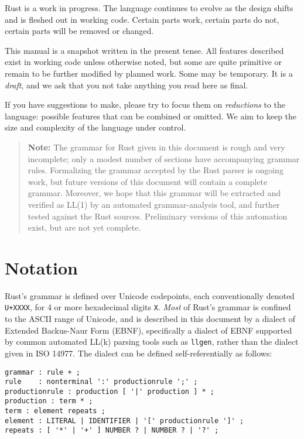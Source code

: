 \documentclass[]{article}
\begin{document}
Rust is a work in progress. The language continues to evolve as the
design shifts and is fleshed out in working code. Certain parts work,
certain parts do not, certain parts will be removed or changed.

This manual is a snapshot written in the present tense. All features
described exist in working code unless otherwise noted, but some are
quite primitive or remain to be further modified by planned work. Some
may be temporary. It is a \emph{draft}, and we ask that you not take
anything you read here as final.

If you have suggestions to make, please try to focus them on
\emph{reductions} to the language: possible features that can be
combined or omitted. We aim to keep the size and complexity of the
language under control.

\begin{quote}
\textbf{Note:} The grammar for Rust given in this document is rough and
very incomplete; only a modest number of sections have accompanying
grammar rules. Formalizing the grammar accepted by the Rust parser is
ongoing work, but future versions of this document will contain a
complete grammar. Moreover, we hope that this grammar will be extracted
and verified as LL(1) by an automated grammar-analysis tool, and further
tested against the Rust sources. Preliminary versions of this automation
exist, but are not yet complete.
\end{quote}

\section{Notation}\label{notation}

Rust's grammar is defined over Unicode codepoints, each conventionally
denoted \texttt{U+XXXX}, for 4 or more hexadecimal digits \texttt{X}.
\emph{Most} of Rust's grammar is confined to the ASCII range of Unicode,
and is described in this document by a dialect of Extended Backus-Naur
Form (EBNF), specifically a dialect of EBNF supported by common
automated LL(k) parsing tools such as \texttt{llgen}, rather than the
dialect given in ISO 14977. The dialect can be defined
self-referentially as follows:

\begin{verbatim}
grammar : rule + ;
rule    : nonterminal ':' productionrule ';' ;
productionrule : production [ '|' production ] * ;
production : term * ;
term : element repeats ;
element : LITERAL | IDENTIFIER | '[' productionrule ']' ;
repeats : [ '*' | '+' ] NUMBER ? | NUMBER ? | '?' ;
\end{verbatim}
\end{document}
